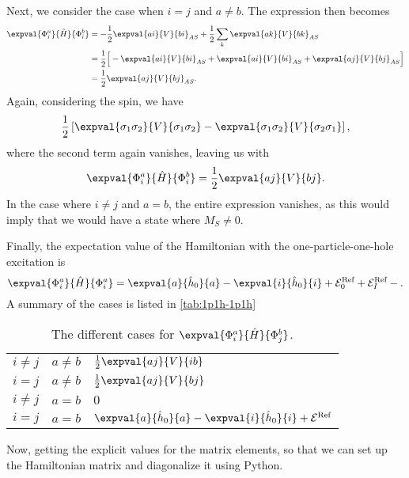 Next, we consider the case when $i = j$ and $a \neq b$.
The expression then becomes
\begin{align*}
    \expval{\Phi_i^a}{\hat{H}}{\Phi_i^b} &= -\frac{1}{2} \expval{ai}{V}{bi}_{AS} + \frac{1}{2} \sum_k \expval{ak}{V}{bk}_{AS} \\
    &= \frac{1}{2} \Big[ - \expval{ai}{V}{bi}_{AS} + \expval{ai}{V}{bi}_{AS} + \expval{aj}{V}{bj}_{AS} \Big] \\
    &= \frac{1}{2} \expval{aj}{V}{bj}_{AS}.
\end{align*}
Again, considering the spin, we have
\begin{equation*}
    \frac{1}{2} \left[
        \expval{\sigma_1 \sigma_2}{V}{\sigma_1 \sigma_2}
        - \expval{\sigma_1 \sigma_2}{V}{\sigma_2 \sigma_1}
    \right],
\end{equation*}
where the second term again vanishes, leaving us with
\begin{equation*}
    \expval{\Phi_i^a}{\hat{H}}{\Phi_i^b} = \frac{1}{2} \expval{aj}{V}{bj}.
\end{equation*}
In the case where $i \neq j$ and $a = b$, the entire expression vanishes, as this would imply that we would have a state where $M_S \neq 0$.

Finally, the expectation value of the Hamiltonian with the one-particle-one-hole excitation is
\begin{equation}\label{eq:1p1h-1p1h-final}
    \expval{\Phi_i^a}{\hat{H}}{\Phi_i^a} = \expval{a}{\hat{h}_0}{a} - \expval{i}{\hat{h}_0}{i} + \mathcal{E}_0^{\text{Ref}} + \mathcal{E}_I^{\text{Ref}} - .
\end{equation}
A summary of the cases is listed in \autoref{tab:1p1h-1p1h}
\begin{table}[ht]
    \centering
    \caption{The different cases for $\expval{\Phi_i^a}{\hat{H}}{\Phi_j^b}$.\label{tab:1p1h-1p1h}}
    \begin{tabular}{lll}
        $i \neq j$ & $a \neq b$ & $\frac{1}{2} \expval{aj}{V}{ib}$ \\
        $i = j$ & $a \neq b$ & $\frac{1}{2} \expval{aj}{V}{bj} $ \\
        $i \neq j$ & $a = b$ & $0$ \\
        $i = j$ & $a = b$ & $\expval{a}{\hat{h}_0}{a} - \expval{i}{\hat{h}_0}{i} + \mathcal{E}^{\text{Ref}}$
    \end{tabular}
\end{table}

Now, getting the explicit values for the matrix elements, so that we can set up the Hamiltonian matrix and diagonalize it using Python.
